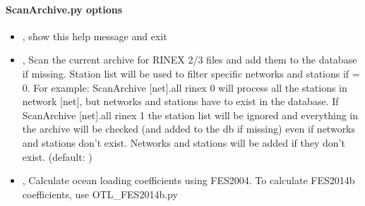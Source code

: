\documentclass[letterpaper,10pt,english]{sphinxmanual}
\begin{document}
\paragraph{ScanArchive.py options}
\label{\detokenize{com:ScanArchive.py-options}}\begin{itemize}
\item {} 
\sphinxAtStartPar
{\hyperref[\detokenize{com:ScanArchive.py--h}]{}}, {\hyperref[\detokenize{com:ScanArchive.py---help}]{}} \sphinxhyphen{} show this help message and exit

\item {} 
\sphinxAtStartPar
{\hyperref[\detokenize{com:ScanArchive.py--rinex}]{}} , {\hyperref[\detokenize{com:ScanArchive.py---rinex}]{}}  \sphinxhyphen{} Scan the current archive for RINEX 2/3 files and add them to the database if missing. Station list will be used to filter specific networks and stations if  = 0. For example: ScanArchive {[}net{]}.all \sphinxhyphen{}rinex 0 will process all the stations in network {[}net{]}, but networks and stations have to exist in the database. If ScanArchive {[}net{]}.all \sphinxhyphen{}rinex 1 the station list will be ignored and everything in the archive will be checked (and added to the db if missing) even if networks and stations don\textasciigrave{}\textasciigrave{}’t exist. Networks and stations will be added if they don’{\color{red}\bfseries{}\textasciigrave{}\textasciigrave{}}t exist. (default: )

\item {} 
\sphinxAtStartPar
{\hyperref[\detokenize{com:ScanArchive.py--otl}]{}}, {\hyperref[\detokenize{com:ScanArchive.py---ocean_loading}]{}} \sphinxhyphen{} Calculate ocean loading coefficients using FES2004. To calculate FES2014b coefficients, use OTL\_FES2014b.py


\end{itemize}
\end{document}

